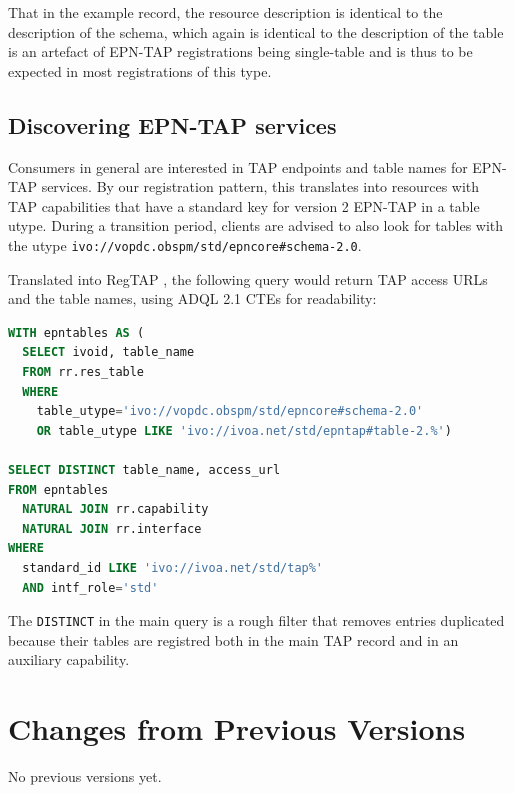 \documentclass[11pt,a4paper]{ivoa}
\begin{document}
That in the example record, the resource description is identical to the
description of the schema, which again is identical to the description
of the table is an artefact of EPN-TAP registrations being single-table
and is thus to be expected in most registrations of this type.

\subsection{Discovering EPN-TAP services}

Consumers in general are interested in TAP endpoints and table names for
EPN-TAP services.  By our registration pattern, this translates into
resources with TAP capabilities that have a standard key for version 2
EPN-TAP in a table utype.  During a transition period, clients are
advised to also look for tables with the utype
\verb|ivo://vopdc.obspm/std/epncore#schema-2.0|.

Translated into RegTAP \citep{2019ivoa.spec.1011D}, the following query
would return TAP access URLs and the table names, using ADQL 2.1 CTEs
for readability:

\begin{lstlisting}[language=SQL]
WITH epntables AS (
  SELECT ivoid, table_name
  FROM rr.res_table
  WHERE
    table_utype='ivo://vopdc.obspm/std/epncore#schema-2.0'
    OR table_utype LIKE 'ivo://ivoa.net/std/epntap#table-2.%')

SELECT DISTINCT table_name, access_url
FROM epntables
  NATURAL JOIN rr.capability
  NATURAL JOIN rr.interface
WHERE
  standard_id LIKE 'ivo://ivoa.net/std/tap%'
  AND intf_role='std'
\end{lstlisting}

The \texttt{DISTINCT} in the main query is a rough filter that removes
entries duplicated because their tables are registred both in the main
TAP record and in an auxiliary capability.

\appendix
\section{Changes from Previous Versions}

No previous versions yet.  



\end{document}

